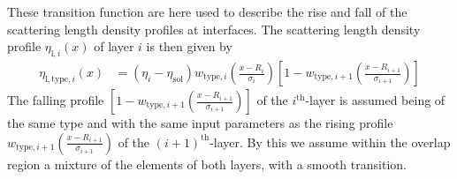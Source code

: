 These transition function are here used to describe the rise and fall of the scattering length density profiles at interfaces.
The scattering length density profile $\eta_{\mathrm{l},i}(x)$ of layer $i$ is then given by
\begin{align} \label{eq:thinlayersprofile}
  \eta_{\mathrm{l,type},i}(x) &=  \left(\eta_i-\eta_\mathrm{sol}\right) w_{\mathrm{type},i}\left(\frac{x-R_{i}}{\sigma_{i}}\right)  \left[1- w_{\mathrm{type},i+1}\left(\frac{x-R_{i+1}}{\sigma_{i+1}}\right)\right]
\end{align}
The falling profile $\left[1- w_{\mathrm{type},i+1}\left(\frac{x-R_{i+1}}{\sigma_{i+1}}\right)\right]$ of the $i^\mathrm{th}$-layer is assumed being of the same type and with the same input parameters as the rising profile $w_{\mathrm{type},i+1}\left(\frac{x-R_{i+1}}{\sigma_{i+1}}\right)$ of the $(i+1)^\mathrm{th}$-layer. By this we assume within the overlap region a mixture of the elements of both layers, with a smooth transition.

